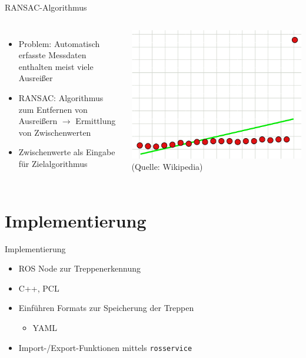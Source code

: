 \documentclass[18pt]{beamer}
\begin{document}
\begin{frame}{RANSAC-Algorithmus}
	\begin{columns}
		\begin{itemize}
			\item Problem: Automatisch erfasste Messdaten enthalten meist viele Ausreißer
			\item RANSAC: Algorithmus zum Entfernen von Ausreißern \(\longrightarrow\) Ermittlung von Zwischenwerten
			\item Zwischenwerte als Eingabe für Zielalgorithmus
		\end{itemize}
		\includegraphics[scale=0.28]{images/ausreisser.pdf}
		(Quelle: Wikipedia)
	\end{columns}
\end{frame}



\section{Implementierung}

\begin{frame}{Implementierung}
	\begin{itemize}
		\item ROS Node zur Treppenerkennung
		\item C++, PCL
		\item Einführen Formats zur Speicherung der Treppen
		\begin{itemize}
			\item YAML
		\end{itemize}
		\item Import-/Export-Funktionen mittels \texttt{rosservice}
	\end{itemize}
\end{frame}
\end{document}
